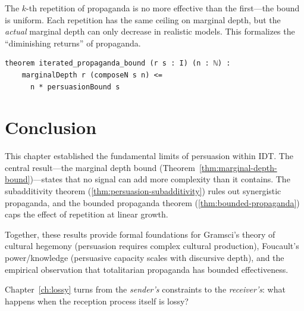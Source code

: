 The $k$-th repetition of propaganda is no more effective than the first---the
bound is uniform.  Each repetition has the same ceiling on marginal depth,
but the \emph{actual} marginal depth can only decrease in realistic models.
This formalizes the ``diminishing returns'' of propaganda.

\begin{lstlisting}[caption={Iterated propaganda bound in Lean~4.}]
theorem iterated_propaganda_bound (r s : I) (n : ℕ) :
    marginalDepth r (composeN s n) <=
      n * persuasionBound s
\end{lstlisting}


\section{Conclusion}
\label{sec:pers-conclusion}

This chapter established the fundamental limits of persuasion within IDT\@.
The central result---the marginal depth bound
(Theorem~\ref{thm:marginal-depth-bound})---states that no signal can add
more complexity than it contains.  The subadditivity theorem
(\ref{thm:persuasion-subadditivity}) rules out synergistic propaganda, and
the bounded propaganda theorem (\ref{thm:bounded-propaganda}) caps the
effect of repetition at linear growth.

Together, these results provide formal foundations for Gramsci's theory of
cultural hegemony (persuasion requires complex cultural production),
Foucault's power/knowledge (persuasive capacity scales with discursive
depth), and the empirical observation that totalitarian propaganda has
bounded effectiveness.

Chapter~\ref{ch:lossy} turns from the \emph{sender's} constraints to the
\emph{receiver's}: what happens when the reception process itself is lossy?
